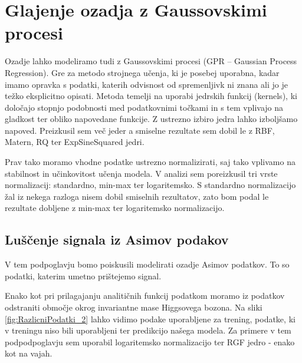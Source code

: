 \documentclass[slovene,11pt,a4paper]{article}
\begin{document}
\section{Glajenje ozadja z Gaussovskimi procesi}

Ozadje lahko modeliramo tudi z Gaussovskimi procesi (GPR – Gaussian Process Regression). Gre za metodo strojnega učenja, ki je posebej uporabna, kadar imamo opravka s podatki, katerih odvisnost od spremenljivk ni znana ali jo je težko eksplicitno opisati. Metoda temelji na uporabi jedrskih funkcij (kernels), ki določajo stopnjo podobnosti med podatkovnimi točkami in s tem vplivajo na gladkost ter obliko napovedane funkcije. Z ustrezno izbiro jedra lahko izboljšamo napoved. Preizkusil sem več jeder a smiselne rezultate sem dobil le z RBF, Matern, RQ ter ExpSineSquared jedri.

Prav tako moramo vhodne podatke ustrezno normalizirati, saj tako vplivamo na stabilnost in učinkovitost učenja modela. V analizi sem poreizkusil tri vrste normalizacij: standardno, min-max ter logaritemsko. S standardno normalizacijo žal iz nekega razloga nisem dobil smiselnih rezultatov, zato bom podal le rezultate dobljene z min-max ter logaritemsko normalizacijo.

\subsection{Luščenje signala iz Asimov podakov}

V tem podpoglavju bomo poiskusili modelirati ozadje Asimov podatkov. To so podatki, katerim umetno prištejemo signal.

Enako kot pri prilagajanju analitičnih funkcij podatkom moramo iz podatkov odstraniti območje okrog invariantne mase Higgsovega bozona. Na sliki \ref{fig:RazlicniPodatki_2} lahko vidimo podake uporabljene za trening, podatke, ki v treningu niso bili uporabljeni ter predikcijo našega modela. Za primere v tem podpodpoglavju sem uporabil logaritemsko normalizacijo ter RGF jedro - enako kot na vajah.
\end{document}
